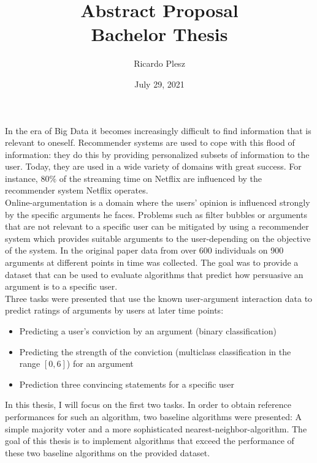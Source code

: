 \documentclass{article}
\begin{document}

\title{\vspace{-0.0cm} Abstract Proposal\\
Bachelor Thesis
\\}
\author{Ricardo Plesz}
\date{July 29, 2021}
\maketitle

In the era of Big Data it becomes increasingly difficult to find information that is relevant to oneself. 
Recommender systems are used to cope with this flood of information: 
they do this by providing personalized subsets of information to the user. 
Today, they are used in a wide variety of domains with great success. For instance, $80\%$ of the
streaming time on Netflix are influenced by the recommender system Netflix operates. \cite{gomez2015netflix}
\\

Online-argumentation is a domain where the users' opinion is influenced strongly by the
specific arguments he faces. Problems such as filter bubbles or arguments that
are not relevant to a specific user can be mitigated by using a recommender system
which provides suitable arguments to the user-depending on the objective of the system.
In the original paper \cite{HowIArgue} data from over 600 individuals on 900 arguments at different points in time was collected.
The goal was to provide a dataset that can be used to evaluate algorithms that predict how persuasive 
an argument is to a specific user.\\
Three tasks were presented that use the known user-argument interaction data to predict ratings of arguments 
by users at later time points:
\begin{itemize}
    \item Predicting a user's conviction by an argument (binary classification)
    \item Predicting the strength of the conviction (multiclass classification in the range $[0,6]$) for an argument
    \item Prediction three convincing statements for a specific user
\end{itemize}
In this thesis, I will focus on the first two tasks.
In order to obtain reference performances for such an algorithm, two baseline algorithms
were presented: A simple majority voter and a more sophisticated nearest-neighbor-algorithm.
The goal of this thesis is to implement algorithms that exceed the performance of these two 
baseline algorithms on the provided dataset.
\\
\end{document}
